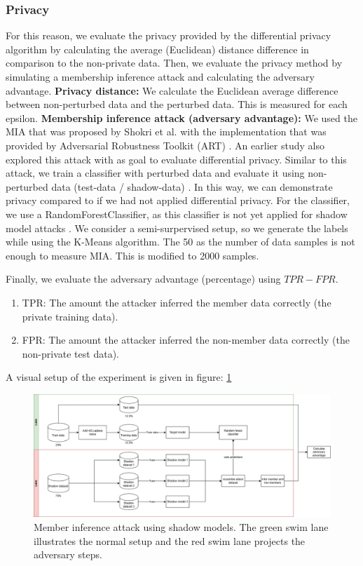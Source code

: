 \subsubsection{Privacy}
For this reason, we evaluate the privacy provided by the differential privacy algorithm by calculating the average (Euclidean) distance difference in comparison to the non-private data.
Then, we evaluate the privacy method by simulating a membership inference attack and calculating the adversary advantage. \newline
\textbf{Privacy distance:} We calculate the Euclidean average difference between non-perturbed data and the perturbed data.
This is measured for each epsilon. \newline
\textbf{Membership inference attack (adversary advantage):}
%
We used the MIA that was proposed by Shokri et al. with the implementation that was provided by Adversarial Robustness Toolkit (ART) \citep{noauthor_adversarial_2023}.
An earlier study also explored this attack with as goal to evaluate differential privacy.
Similar to this attack, we train a classifier with perturbed data and evaluate it using non-perturbed data (test-data / shadow-data) \citep{zhao_not_2020}.
In this way, we can demonstrate privacy compared to if we had not applied differential privacy.
For the classifier, we use a RandomForestClassifier, as this classifier is not yet applied for shadow model attacks \citep{rigaki_survey_2021}.
We consider a semi-surpervised setup, so we generate the labels while using the K-Means algorithm.
The 50 as the number of data samples is not enough to measure MIA. This is modified to 2000 samples.

Finally, we evaluate the adversary advantage (percentage) using $TPR - FPR$.
\begin{enumerate}
  \item TPR: The amount the attacker inferred the member data correctly (the private training data).
  \item FPR: The amount the attacker inferred the non-member data correctly (the non-private test data).
\end{enumerate}
A visual setup of the experiment is given in figure: \ref{figure:mi-attack}

\begin{figure}
  \includegraphics[width=1.2\textwidth]{Method/images/MI-setup.png}
  \caption{Member inference attack using shadow models. The green swim lane illustrates the normal setup and the red swim lane projects the adversary steps.}
  \label{figure:mi-attack}
\end{figure}
\newpage

